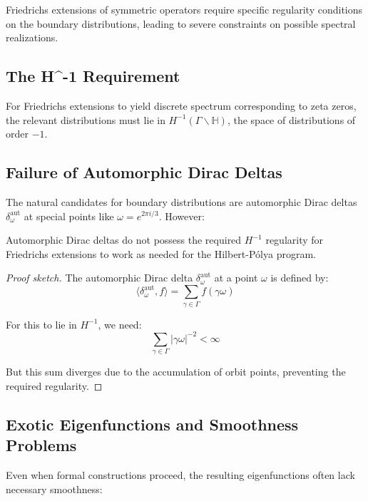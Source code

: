 Friedrichs extensions of symmetric operators require specific regularity conditions on the boundary distributions, leading to severe constraints on possible spectral realizations.

\subsection{The H^{-1} Requirement}

\begin{theorem}
For Friedrichs extensions to yield discrete spectrum corresponding to zeta zeros, the relevant distributions must lie in $H^{-1}(\Gamma \backslash \mathbb{H})$, the space of distributions of order $-1$.
\end{theorem}

\subsection{Failure of Automorphic Dirac Deltas}

The natural candidates for boundary distributions are automorphic Dirac deltas $\delta^{\text{aut}}_\omega$ at special points like $\omega = e^{2\pi i/3}$. However:

\begin{proposition}
Automorphic Dirac deltas do not possess the required $H^{-1}$ regularity for Friedrichs extensions to work as needed for the Hilbert-P\'olya program.
\end{proposition}

\begin{proof}[Proof sketch]
The automorphic Dirac delta $\delta^{\text{aut}}_\omega$ at a point $\omega$ is defined by:
$$\langle \delta^{\text{aut}}_\omega, f \rangle = \sum_{\gamma \in \Gamma} f(\gamma \omega)$$

For this to lie in $H^{-1}$, we need:
$$\sum_{\gamma \in \Gamma} |\gamma \omega|^{-2} < \infty$$

But this sum diverges due to the accumulation of orbit points, preventing the required regularity.
\end{proof}

\subsection{Exotic Eigenfunctions and Smoothness Problems}

Even when formal constructions proceed, the resulting eigenfunctions often lack necessary smoothness:

